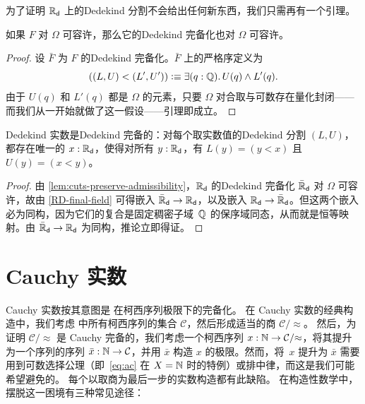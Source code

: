 为了证明 $\mathbb{R}_\mathsf{d}$ 上的Dedekind 分割不会给出任何新东西，我们只需再有一个引理。

\begin{lem} \label{lem:cuts-preserve-admissibility}
  如果 $F$ 对 $\Omega$ 可容许，那么它的Dedekind 完备化也对 $\Omega$ 可容许。
\end{lem}

\begin{proof}
  设 $\bar{F}$ 为 $F$ 的Dedekind 完备化。$\bar{F}$ 上的严格序定义为
  \begin{equation*}
    ((L,U) < (L',U')) \defeq \exis{q : \Q} U(q) \land L'(q).
  \end{equation*}
  由于 $U(q)$ 和 $L'(q)$ 都是 $\Omega$ 的元素，只要 $\Omega$ 对合取与可数存在量化封闭——而我们从一开始就做了这一假设——引理即成立。
\end{proof}

\begin{cor} \label{RD-dedekind-complete}
  Dedekind 实数是Dedekind 完备的：对每个取实数值的Dedekind 分割 $(L, U)$，都存在唯一的 $x : \mathbb{R}_\mathsf{d}$，使得对所有 $y : \mathbb{R}_\mathsf{d}$，有 $L(y) = (y < x)$ 且 $U(y) = (x < y)$。
\end{cor}

\begin{proof}
  由 \cref{lem:cuts-preserve-admissibility}，$\mathbb{R}_\mathsf{d}$ 的Dedekind 完备化 $\bar{\mathbb{R}}_\mathsf{d}$ 对 $\Omega$ 可容许，故由 \cref{RD-final-field} 可得嵌入 $\bar{\mathbb{R}}_\mathsf{d} \to \mathbb{R}_\mathsf{d}$，以及嵌入 $\mathbb{R}_\mathsf{d} \to \bar{\mathbb{R}}_\mathsf{d}$。但这两个嵌入必为同构，因为它们的复合是固定稠密子域~$\mathbb{Q}$ 的保序域同态，从而就是恒等映射。由 $\bar{\mathbb{R}}_\mathsf{d} \to \mathbb{R}_\mathsf{d}$ 为同构，推论立即得证。
\end{proof}

%

\section{Cauchy 实数}
\label{sec:cauchy-reals}

%
%
%
Cauchy 实数按其意图是 \Q 在柯西序列极限下的完备化。
在 Cauchy 实数的经典构造中，我们考虑 \Q 中所有柯西序列的集合 $\mathcal{C}$，然后形成适当的商 $\mathcal{C}/{\approx}$。
然后，为证明 $\mathcal{C}/{\approx}$ 是 Cauchy 完备的，我们考虑一个柯西序列 $x : \mathbb{N} \to \mathcal{C}/{\approx}$，将其提升为一个序列的序列 $\bar{x} : \mathbb{N} \to \mathcal{C}$，并用 $\bar{x}$ 构造 $x$ 的极限。然而，将~$x$ 提升为 $\bar{x}$ 需要用到可数选择公理（即~\eqref{eq:ac} 在 $X=\mathbb{N}$ 时的特例）或排中律，而这是我们可能希望避免的。
%
每个以取商为最后一步的实数构造都有此缺陷。
在构造性数学中，摆脱这一困境有三种常见途径：
%
%
%

